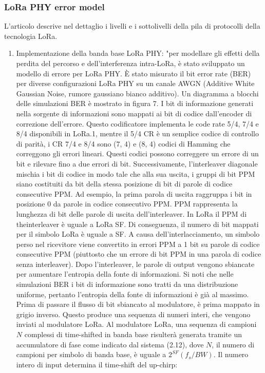 \documentclass[a4paper]{report} %
\begin{document}
\subsubsection{LoRa PHY error model}
L'articolo \cite{art:rif.49} descrive nel dettaglio i livelli e i sottolivelli della pila di protocolli della tecnologia LoRa.
\begin{enumerate}
\item Implementazione della banda base LoRa PHY: 
"per modellare gli effetti della perdita del percorso e dell'interferenza intra-LoRa, è stato sviluppato un modello di errore per LoRa PHY. È stato misurato il bit error rate (BER) per diverse configurazioni LoRa PHY su un canale AWGN (Additive White Gaussian Noise, rumore gaussiano bianco additivo). Un diagramma a blocchi delle simulazioni BER è mostrato in figura 7. I bit di informazione generati nella sorgente di informazioni sono mappati ai bit di codice dall'encoder di correzione dell'errore. Questo codificatore implementa le code rate 5/4, 7/4 e 8/4 disponibili in LoRa.1, mentre il 5/4 CR è un semplice codice di controllo di parità, i CR 7/4 e 8/4 sono (7, 4) e (8, 4) codici di Hamming che correggono gli errori lineari. Questi codici possono correggere un errore di un bit e rilevare fino a due errori di bit. Successivamente, l'interleaver diagonale mischia i bit di codice in modo tale che alla sua uscita, i gruppi di bit PPM siano costituiti da bit della stessa posizione di bit di parole di codice consecutive PPM. Ad esempio, la prima parola di uscita raggruppa i bit in posizione 0 da parole in codice consecutivo PPM. PPM rappresenta la lunghezza di bit delle parole di uscita dell'interleaver. In LoRa il PPM di theinterleaver è uguale a LoRa SF. Di conseguenza, il numero di bit mappati per il simbolo LoRa è uguale a SF. A causa dell'interlacciamento, un simbolo perso nel ricevitore viene convertito in errori PPM a 1 bit su parole di codice consecutive PPM (piuttosto che un errore di bit PPM in una parola di codice senza interleaver). Dopo l'interleaver, le parole di output vengono sbiancate per aumentare l'entropia della fonte di informazioni. Si noti che nelle simulazioni BER i bit di informazione sono tratti da una distribuzione uniforme, pertanto l'entropia della fonte di informazioni è già al massimo. Prima di passare il flusso di bit sbiancato al modulatore, è prima mappato in grigio inverso. Questo produce una sequenza di numeri interi, che vengono inviati al modulatore LoRa. Al modulatore LoRa, una sequenza di campioni $N$ complessi di time-shifted in banda base risulterà generata tramite un accumulatore di fase come indicato dal sistema (2.12), dove $N$, il numero di campioni per simbolo di banda base, è uguale a $2^{SF} (f_s / BW)$. Il numero intero di input determina il time-shift del up-chirp:

\end{enumerate}
\end{document}
